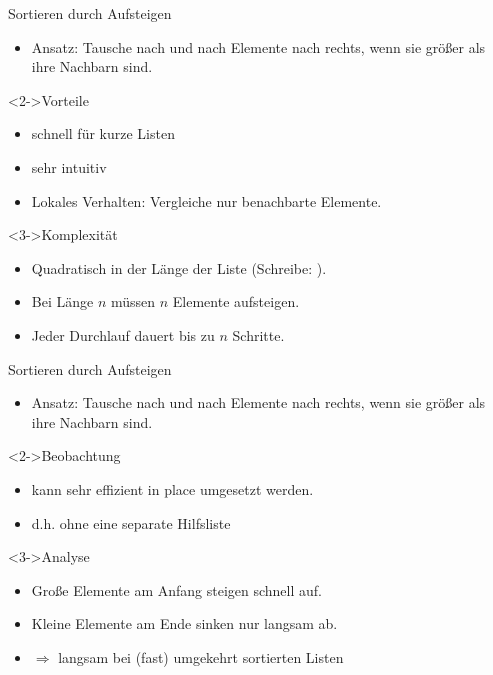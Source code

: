 \begin{frame}
    \begin{block}{Sortieren durch Aufsteigen}
        \begin{itemize}
            \item Ansatz: Tausche nach und nach Elemente nach rechts, wenn sie größer als ihre Nachbarn sind.
        \end{itemize}
    \end{block}
    \begin{block}<2->{Vorteile}
        \begin{itemize}
            \item schnell für kurze Listen
            \item sehr intuitiv
            \item Lokales Verhalten: Vergleiche nur benachbarte Elemente.
        \end{itemize}
    \end{block}
    \begin{block}<3->{Komplexität}
        \begin{itemize}
            \item Quadratisch in der Länge der Liste  (Schreibe: \alert{\osquare}).
            \item Bei Länge $n$ müssen $n$ Elemente aufsteigen.
            \item Jeder Durchlauf dauert bis zu $n$ Schritte.
        \end{itemize}
    \end{block}
\end{frame}

\begin{frame}
    \begin{block}{Sortieren durch Aufsteigen}
        \begin{itemize}
            \item Ansatz: Tausche nach und nach Elemente nach rechts, wenn sie größer als ihre Nachbarn sind.
        \end{itemize}
    \end{block}
    \begin{block}<2->{Beobachtung}
        \begin{itemize}
            \item kann sehr effizient \alert{in place} umgesetzt werden.
            \item d.h. ohne eine separate Hilfsliste
        \end{itemize}
    \end{block}
    \begin{block}<3->{Analyse}
        \begin{itemize}
            \item Große Elemente am Anfang steigen schnell auf.
            \item Kleine Elemente am Ende sinken nur langsam ab.
            \item $\Rightarrow$ langsam bei (fast) umgekehrt sortierten Listen
        \end{itemize}
    \end{block}
\end{frame}

